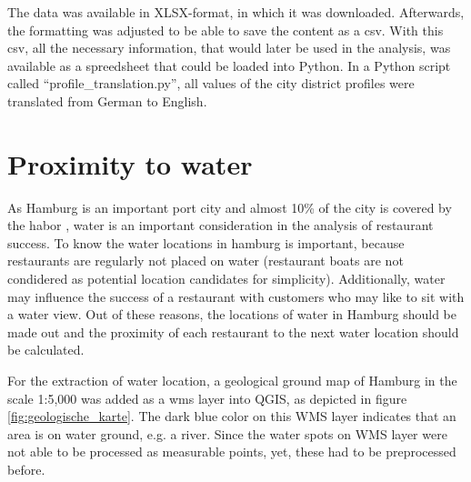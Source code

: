 \documentclass[a4paper, 11pt, oneside]{Thesis}  %
\begin{document}
The data was available in XLSX-format, in which it was downloaded. Afterwards, the formatting was adjusted to be able to save the content as a \ac{csv}. With this \ac{csv}, all the necessary information, that would later be used in the analysis, was available as a spreedsheet that could be loaded into Python. In a Python script called ``profile\_translation.py'', all values of the city district profiles were translated from German to English.

\section{Proximity to water}
\label{proximity_to_water}

As Hamburg is an important port city and almost 10\% of the city is covered by the habor \cite{HamburgStadt2019}, water is an important consideration in the analysis of restaurant success. To know the water locations in hamburg is important, because restaurants are regularly not placed on water (restaurant boats are not condidered as potential location candidates for simplicity). Additionally, water may influence the success of a restaurant with customers who may like to sit with a water view. Out of these reasons, the locations of water in Hamburg should be made out and the proximity of each restaurant to the next water location should be calculated.

For the extraction of water location, a geological ground map of Hamburg in the scale 1:5,000 \cite{GeologischeKarte2019} was added as a \ac{wms} layer into QGIS, as depicted in figure \ref{fig:geologische_karte}. The dark blue color on this WMS layer indicates that an area is on water ground, e.g. a river. Since the water spots on WMS layer were not able to be processed as measurable points, yet, these had to be preprocessed before. 
\end{document}
